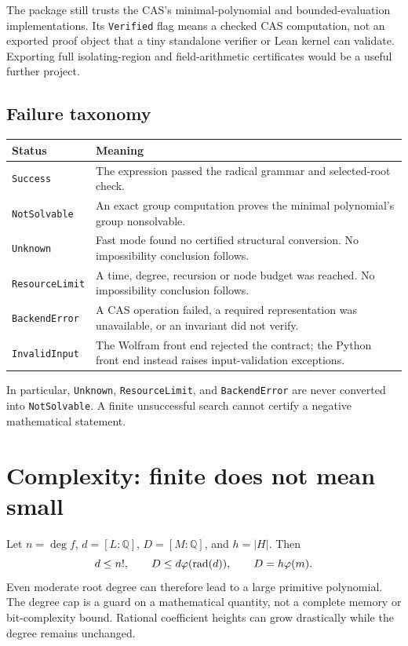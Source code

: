 \documentclass[11pt,letterpaper]{article}
\newcommand{\Q}{\mathbb Q}\newcommand{\C}{\mathbb C}
\newcommand{\code}[1]{\texttt{#1}}
\theoremstyle{definition}\newtheorem{definition}[theorem]{Definition}
\theoremstyle{remark}\newtheorem{remark}[theorem]{Remark}
\begin{document}
The package still trusts the CAS's minimal-polynomial and bounded-evaluation
implementations. Its \code{Verified} flag means a checked CAS computation,
not an exported proof object that a tiny standalone verifier or Lean kernel
can validate. Exporting full isolating-region and field-arithmetic
certificates would be a useful further project.

\subsection{Failure taxonomy}

\begin{longtable}{@{}p{}p{}@{}}
\toprule Status & Meaning \\ \midrule\endhead
\code{Success} & The expression passed the radical grammar and selected-root check. \\
\code{NotSolvable} & An exact group computation proves the minimal polynomial's group nonsolvable. \\
\code{Unknown} & Fast mode found no certified structural conversion. No impossibility conclusion follows. \\
\code{ResourceLimit} & A time, degree, recursion or node budget was reached. No impossibility conclusion follows. \\
\code{BackendError} & A CAS operation failed, a required representation was unavailable, or an invariant did not verify. \\
\code{InvalidInput} & The Wolfram front end rejected the contract; the Python front end instead raises input-validation exceptions. \\
\bottomrule
\end{longtable}

In particular, \code{Unknown}, \code{ResourceLimit}, and \code{BackendError}
are never converted into \code{NotSolvable}. A finite unsuccessful search
cannot certify a negative mathematical statement.

\section{Complexity: finite does not mean small}

Let \(n=\deg f\), \(d=[L:\Q]\), \(D=[M:\Q]\), and \(h=|H|\).
Then
\[
 d\leq n!,\qquad D\leq d\varphi(\operatorname{rad}(d)),\qquad
 D=h\varphi(m).
\]
Even moderate root degree can therefore lead to a large primitive polynomial.
The degree cap is a guard on a mathematical quantity, not a complete memory
or bit-complexity bound. Rational coefficient heights can grow drastically
while the degree remains unchanged.
\end{document}
